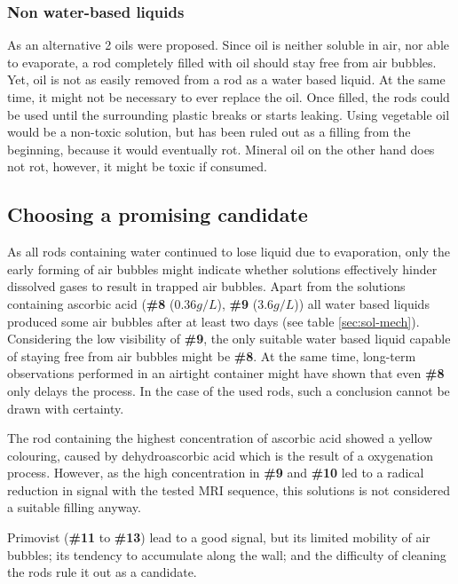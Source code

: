 \subsubsection{Non water-based liquids}
As an alternative 2 oils were proposed.
Since oil is neither soluble in air, nor able to evaporate, a rod completely filled with oil should stay free from air bubbles.
Yet, oil is not as easily removed from a rod as a water based liquid.
At the same time, it might not be necessary to ever replace the oil.
Once filled, the rods could be used until the surrounding plastic breaks or starts leaking.
Using vegetable oil would be a non-toxic solution, but has been ruled out as a filling from the beginning, because it would eventually rot.
Mineral oil on the other hand does not rot, however, it might be toxic if consumed.


\subsection{Choosing a promising candidate}
As all rods containing water continued to lose liquid due to evaporation, only the early forming of air bubbles might indicate whether solutions effectively hinder dissolved gases to result in trapped air bubbles.
Apart from the solutions containing ascorbic acid (\textbf{\#8} ($0.36 g/L$), \textbf{\#9} ($3.6 g/L$)) all water based liquids produced some air bubbles after at least two days (see table \ref{sec:sol-mech}).
Considering the low visibility of \textbf{\#9}, the only suitable water based liquid capable of staying free from air bubbles might be \textbf{\#8}.
At the same time, long-term observations performed in an airtight container might have shown that even \textbf{\#8} only delays the process.
In the case of the used rods, such a conclusion cannot be drawn with certainty.

The rod containing the highest concentration of ascorbic acid showed a yellow colouring, caused by dehydroascorbic acid which is the result of a oxygenation process.
However, as the high concentration in \textbf{\#9} and \textbf{\#10} led to a radical reduction in signal with the tested MRI sequence, this solutions is not considered a suitable filling anyway.

Primovist (\textbf{\#11} to \textbf{\#13}) lead to a good signal, but its limited mobility of air bubbles; its tendency to accumulate along the wall; and the difficulty of cleaning the rods rule it out as a candidate.


